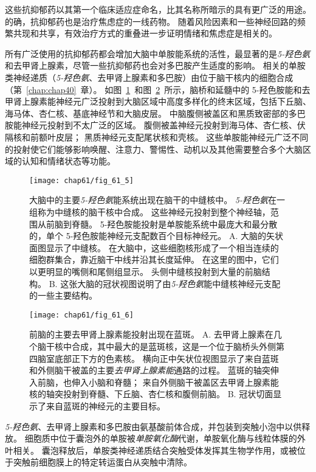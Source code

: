 这些抗抑郁药以其第一个临床适应症命名，比其名称所暗示的具有更广泛的用途。
的确，抗抑郁药也是治疗焦虑症的一线药物。
随着风险因素和一些神经回路的频繁共现和共享，有效治疗方式的重叠进一步证明情绪和焦虑症是相关的。


所有广泛使用的抗抑郁药都会增加大脑中单胺能系统的活性，最显著的是\textit{5-羟色氨}和去甲肾上腺素，尽管一些抗抑郁药也会对多巴胺产生适度的影响。
相关的单胺类神经递质（\textit{5-羟色氨}、去甲肾上腺素和多巴胺）由位于脑干核内的细胞合成（第~\ref{chap:chap40}~章）。
如图~\ref{fig:61_5}~和图~\ref{fig:61_6}~所示，脑桥和延髓中的 5-羟色胺能和去甲肾上腺素能神经元广泛投射到大脑区域中高度多样化的终末区域，包括下丘脑、海马体、杏仁核、基底神经节和大脑皮层。
中脑腹侧被盖区和黑质致密部的多巴胺能神经元投射到不太广泛的区域。
腹侧被盖神经元投射到海马体、杏仁核、伏隔核和前额叶皮层；
黑质神经元支配尾状核和壳核。
这些单胺能神经元广泛不同的投射使它们能够影响唤醒、注意力、警惕性、动机以及其他需要整合多个大脑区域的认知和情绪状态等功能。


\begin{figure}[htbp]
	\centering
	\texttt{[image: chap61/fig\_61\_5]}
	\caption{大脑中的主要\textit{5-羟色氨}能系统出现在脑干的中缝核中。
		\textit{5-羟色氨}在一组称为中缝核的脑干核中合成。
		这些神经元投射到整个神经轴，范围从前脑到脊髓。
		5-羟色胺能投射是单胺能系统中最庞大和最分散的，单个 5-羟色胺能神经元支配数百个目标神经元\cite{heimer2012human}。
		A. 大脑的矢状面图显示了中缝核。
		在大脑中，这些细胞核形成了一个相当连续的细胞群集合，靠近脑干中线并沿其长度延伸。
		在这里的图中，它们以更明显的嘴侧和尾侧组显示。
		头侧中缝核投射到大量的前脑结构。
		B. 这张大脑的冠状视图说明了由\textit{5-羟色氨}能中缝核神经元支配的一些主要结构。}
	\label{fig:61_5}
\end{figure}


\begin{figure}[htbp]
	\centering
	\texttt{[image: chap61/fig\_61\_6]}
	\caption{前脑的主要去甲肾上腺素能投射出现在蓝斑\cite{heimer2012human}。
		A. 去甲肾上腺素在几个脑干核中合成，其中最大的是蓝斑核，这是一个位于脑桥头外侧第四脑室底部正下方的色素核。
		横向正中矢状位视图显示了来自蓝斑和外侧脑干被盖的主要\textit{去甲肾上腺素能}通路的过程。
		蓝斑的轴突伸入前脑，也伸入小脑和脊髓；
		来自外侧脑干被盖区去甲肾上腺素能核的轴突投射到脊髓、下丘脑、杏仁核和腹侧前脑。
		B. 冠状切面显示了来自蓝斑的神经元的主要目标。}
	\label{fig:61_6}
\end{figure}


\textit{5-羟色氨}、去甲肾上腺素和多巴胺由氨基酸前体合成，并包装到突触小泡中以供释放。
细胞质中位于囊泡外的单胺被\textit{单胺氧化酶}代谢，单胺氧化酶与线粒体膜的外叶相关。
囊泡释放后，单胺类神经递质结合突触受体发挥其生物学作用，或被位于突触前细胞膜上的特定转运蛋白从突触中清除。


